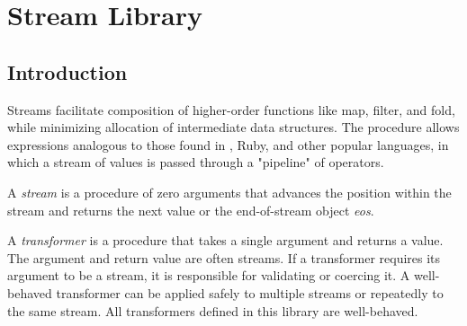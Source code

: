 %
%
%

\chapter {Stream Library}\label{chap:stream}

\section {Introduction}

Streams facilitate composition of higher-order functions like map, filter, and fold, while
minimizing allocation of intermediate data structures. The  procedure allows
expressions analogous to those found in \csharp, Ruby, and other popular languages, in
which a stream of values is passed through a "pipeline" of operators.

A \emph{stream} is a procedure of zero arguments that advances the position
within the stream and returns the next value or the end-of-stream object \emph{eos}.

A \emph{transformer} is a procedure that takes a single argument and
returns a value.  The argument and return value are often streams. If a transformer
requires its argument to be a stream, it is responsible for validating or coercing it. A
well-behaved transformer can be applied safely to multiple streams or repeatedly to the
same stream. All transformers defined in this library are well-behaved.

